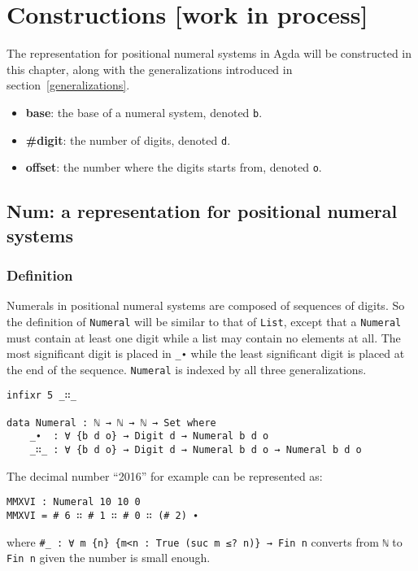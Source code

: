 \documentclass[\main/thesis.tex]{subfiles}
\begin{document}
\chapter{Constructions [work in process]}\label{constructions}

The representation for positional numeral systems in Agda will be constructed in
this chapter, along with the generalizations introduced in section~\ref{generalizations}.

\begin{itemize}
    \item \textbf{base}: the base of a numeral system, denoted {\lstinline|b|}.
    \item \textbf{\#digit}: the number of digits, denoted {\lstinline|d|}.
    \item \textbf{offset}: the number where the digits starts from, denoted {\lstinline|o|}.
\end{itemize}



\section{Num: a representation for positional numeral systems}\label{representation}

\subsection{Definition}

Numerals in positional numeral systems are composed of sequences of digits.
So the definition of {\lstinline|Numeral|} will be similar to that of {\lstinline|List|},
except that a {\lstinline|Numeral|} must contain at least one digit while a list
may contain no elements at all. The most significant digit is placed in {\lstinline|_∙|}
while the least significant digit is placed at the end of the sequence.
{\lstinline|Numeral|} is indexed by all three generalizations.

\begin{lstlisting}
infixr 5 _∷_

data Numeral : ℕ → ℕ → ℕ → Set where
    _∙  : ∀ {b d o} → Digit d → Numeral b d o
    _∷_ : ∀ {b d o} → Digit d → Numeral b d o → Numeral b d o
\end{lstlisting}

The decimal number ``2016'' for example can be represented as:

\begin{lstlisting}
MMXVI : Numeral 10 10 0
MMXVI = # 6 ∷ # 1 ∷ # 0 ∷ (# 2) ∙
\end{lstlisting}
%
where {\lstinline|#_ : ∀ m {n} {m<n : True (suc m ≤? n)} → Fin n|} converts from
{\lstinline|ℕ|} to {\lstinline|Fin n|} given the number is small enough.
\end{document}
